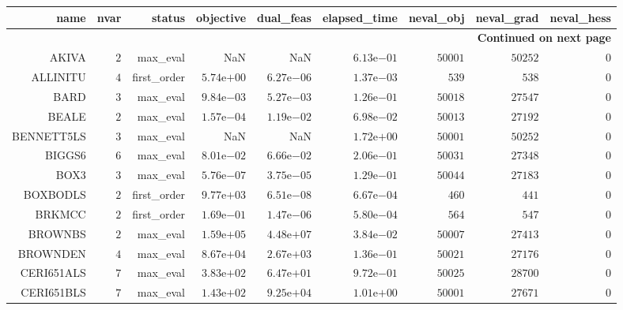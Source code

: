 \begin{longtable}{rrrrrrrrr}
\hline
name & nvar & status & objective & dual\_feas & elapsed\_time & neval\_obj & neval\_grad & neval\_hess \\\hline
\endhead
\hline
\multicolumn{9}{r}{{\bfseries Continued on next page}}\\
\hline
\endfoot
\endlastfoot
AKIVA & \(     2\) & max\_eval &       NaN &       NaN & \( 6.13\)e\(-01\) & \( 50001\) & \( 50252\) & \(     0\) \\
ALLINITU & \(     4\) & first\_order & \( 5.74\)e\(+00\) & \( 6.27\)e\(-06\) & \( 1.37\)e\(-03\) & \(   539\) & \(   538\) & \(     0\) \\
BARD & \(     3\) & max\_eval & \( 9.84\)e\(-03\) & \( 5.27\)e\(-03\) & \( 1.26\)e\(-01\) & \( 50018\) & \( 27547\) & \(     0\) \\
BEALE & \(     2\) & max\_eval & \( 1.57\)e\(-04\) & \( 1.19\)e\(-02\) & \( 6.98\)e\(-02\) & \( 50013\) & \( 27192\) & \(     0\) \\
BENNETT5LS & \(     3\) & max\_eval &       NaN &       NaN & \( 1.72\)e\(+00\) & \( 50001\) & \( 50252\) & \(     0\) \\
BIGGS6 & \(     6\) & max\_eval & \( 8.01\)e\(-02\) & \( 6.66\)e\(-02\) & \( 2.06\)e\(-01\) & \( 50031\) & \( 27348\) & \(     0\) \\
BOX3 & \(     3\) & max\_eval & \( 5.76\)e\(-07\) & \( 3.75\)e\(-05\) & \( 1.29\)e\(-01\) & \( 50044\) & \( 27183\) & \(     0\) \\
BOXBODLS & \(     2\) & first\_order & \( 9.77\)e\(+03\) & \( 6.51\)e\(-08\) & \( 6.67\)e\(-04\) & \(   460\) & \(   441\) & \(     0\) \\
BRKMCC & \(     2\) & first\_order & \( 1.69\)e\(-01\) & \( 1.47\)e\(-06\) & \( 5.80\)e\(-04\) & \(   564\) & \(   547\) & \(     0\) \\
BROWNBS & \(     2\) & max\_eval & \( 1.59\)e\(+05\) & \( 4.48\)e\(+07\) & \( 3.84\)e\(-02\) & \( 50007\) & \( 27413\) & \(     0\) \\
BROWNDEN & \(     4\) & max\_eval & \( 8.67\)e\(+04\) & \( 2.67\)e\(+03\) & \( 1.36\)e\(-01\) & \( 50021\) & \( 27176\) & \(     0\) \\
CERI651ALS & \(     7\) & max\_eval & \( 3.83\)e\(+02\) & \( 6.47\)e\(+01\) & \( 9.72\)e\(-01\) & \( 50025\) & \( 28700\) & \(     0\) \\
CERI651BLS & \(     7\) & max\_eval & \( 1.43\)e\(+02\) & \( 9.25\)e\(+04\) & \( 1.01\)e\(+00\) & \( 50001\) & \( 27671\) & \(     0\) \\

\end{longtable}
